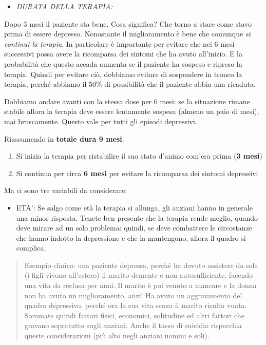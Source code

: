 \documentclass[]{article}
\begin{document}
\begin{itemize}
\item
  \emph{DURATA DELLA TERAPIA:}
\end{itemize}

Dopo 3 mesi il paziente sta bene. Cosa significa? Che torno a stare come
stavo prima di essere depresso. Nonostante il miglioramento è bene che
comunque \emph{si continui la terapia}. In particolare è importante per
evitare che nei 6 mesi successivi possa avere la ricomparsa dei sintomi
che ha avuto all'inizio. E la probabilità che questo accada aumenta se
il paziente ha sospeso e ripreso la terapia. Quindi per evitare ciò,
dobbiamo evitare di sospendere in tronco la terapia, perché abbiamo il
50\% di possibilità che il paziente abbia una ricaduta.

Dobbiamo andare avanti con la stessa dose per 6 mesi: se la situazione
rimane stabile allora la terapia deve essere lentamente sospesa (almeno
un paio di mesi), mai bruscamente. Questo vale per tutti gli episodi
depressivi.

Riassumendo in \textbf{totale dura 9 mesi}.

\begin{enumerate}
\def\labelenumi{\arabic{enumi}.}
\item
  Si inizia la terapia per ristabilire il suo stato d'animo com'era
  prima (\textbf{3 mesi})
\item
  Si continua per circa \textbf{6 mesi} per evitare la ricomparsa dei
  sintomi depressivi
\end{enumerate}

Ma ci sono tre variabili da considerare:

\begin{itemize}
\item
  ETA': Se salgo come età la terapia si allunga, gli anziani hanno in
  generale una minor risposta. Tenete ben presente che la terapia rende
  meglio, quando deve mirare ad un solo problema: quindi, se deve
  combattere le circostanze che hanno indotto la depressione e che la
  mantengono, allora il quadro si complica.
\end{itemize}

\begin{quote}
Esempio clinico: una paziente depressa, perché ha dovuto assistere da
sola (i figli vivono all'estero) il marito demente e non
autosufficiente, facendo una vita da reclusa per anni. Il marito è poi
venuto a mancare e la donna non ha avuto un miglioramento, anzi! Ha
avuto un aggravamento del quadro depressivo, perché ora la sua vita
senza il marito risulta vuota. Sommate quindi fattori fisici, economici,
solitudine ed altri fattori che gravano sopratutto sugli anziani. Anche
il tasso di suicidio rispecchia queste considerazioni (più alto negli
anziani uomini e soli).
\end{quote}
\end{document}
